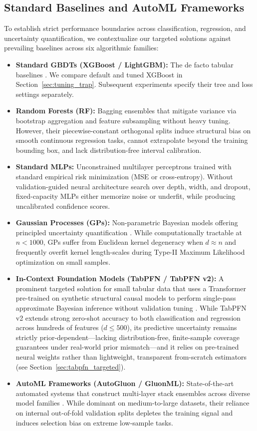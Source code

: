 \documentclass{article}
\begin{document}
\subsection{Standard Baselines and AutoML Frameworks}
To establish strict performance boundaries across classification, regression, and uncertainty quantification, we contextualize our targeted solutions against prevailing baselines across six algorithmic families:
\begin{itemize}
    \item \textbf{Standard GBDTs (XGBoost / LightGBM):} The de facto tabular baselines \cite{chen2016xgboost, ke2017lightgbm}. We compare default and tuned XGBoost in Section~\ref{sec:tuning_trap}. Subsequent experiments specify their tree and loss settings separately.
    \item \textbf{Random Forests (RF):} Bagging ensembles that mitigate variance via bootstrap aggregation and feature subsampling without heavy tuning. However, their piecewise-constant orthogonal splits induce structural bias on smooth continuous regression tasks, cannot extrapolate beyond the training bounding box, and lack distribution-free interval calibration.
    \item \textbf{Standard MLPs:} Unconstrained multilayer perceptrons trained with standard empirical risk minimization (MSE or cross-entropy). Without validation-guided neural architecture search over depth, width, and dropout, fixed-capacity MLPs either memorize noise or underfit, while producing uncalibrated confidence scores.
    \item \textbf{Gaussian Processes (GPs):} Non-parametric Bayesian models offering principled uncertainty quantification \cite{williams2006gaussian}. While computationally tractable at $n < 1000$, GPs suffer from Euclidean kernel degeneracy when $d \approx n$ and frequently overfit kernel length-scales during Type-II Maximum Likelihood optimization on small samples.
    \item \textbf{In-Context Foundation Models (TabPFN / TabPFN v2):} A prominent targeted solution for small tabular data that uses a Transformer pre-trained on synthetic structural causal models to perform single-pass approximate Bayesian inference without validation tuning \cite{hollmann2022tabpfn, hollmann2025tabpfn}. While TabPFN v2 extends strong zero-shot accuracy to both classification and regression across hundreds of features ($d \le 500$), its predictive uncertainty remains strictly prior-dependent—lacking distribution-free, finite-sample coverage guarantees under real-world prior mismatch—and it relies on pre-trained neural weights rather than lightweight, transparent from-scratch estimators (see Section~\ref{sec:tabpfn_targeted}).
    \item \textbf{AutoML Frameworks (AutoGluon / GluonML):} State-of-the-art automated systems that construct multi-layer stack ensembles across diverse model families \cite{erickson2020autogluon}. While dominant on medium-to-large datasets, their reliance on internal out-of-fold validation splits depletes the training signal and induces selection bias on extreme low-sample tasks.
\end{itemize}
\end{document}
